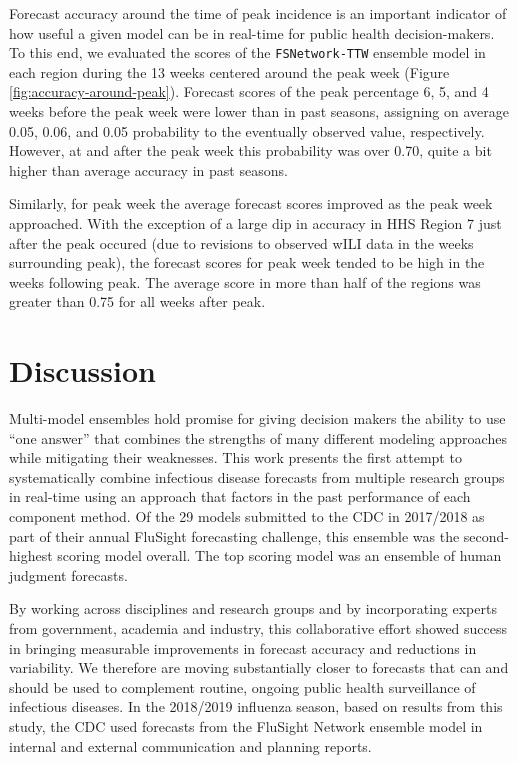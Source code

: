 \documentclass{article}\usepackage[]{graphicx}\usepackage[]{color}
\begin{document}
Forecast accuracy around the time of peak incidence is an important indicator of how useful a given model can be in real-time for public health decision-makers.
To this end, we evaluated the scores of the {\tt FSNetwork-TTW} ensemble model in each region during the 13 weeks centered around the peak week (Figure \ref{fig:accuracy-around-peak}).
Forecast scores of the peak percentage 6, 5, and 4 weeks before the peak week were lower than in past seasons, assigning on average
0.05,
0.06, and 
0.05
probability to the eventually observed value, respectively. 
However, at and after the peak week this probability was over 0.70, quite a bit higher than average accuracy in past seasons.

Similarly, for peak week the average forecast scores improved as the peak week approached. With the exception of a large dip in accuracy in HHS Region 7 just after the peak occured (due to revisions to observed wILI data in the weeks surrounding peak), the forecast scores for peak week tended to be high in the weeks following peak. The average score in more than half of the regions was greater than 0.75 for all weeks after peak. 


\section*{Discussion}

Multi-model ensembles hold promise for giving decision makers the ability to use ``one answer'' that combines the strengths of many different modeling approaches while mitigating their weaknesses. 
This work presents the first attempt to systematically combine infectious disease forecasts from multiple research groups in real-time using an approach that factors in the past performance of each component method.
Of the 29 models submitted to the CDC in 2017/2018 as part of their annual FluSight forecasting challenge, this ensemble was the second-highest scoring model overall. 
The top scoring model was an ensemble of human judgment forecasts.\cite{farrow2017human}

By working across disciplines and research groups and by incorporating experts from government, academia and industry, this collaborative effort showed success in bringing measurable improvements in forecast accuracy and reductions in variability.
We therefore are moving substantially closer to forecasts that can and should be used to complement routine, ongoing public health surveillance of infectious diseases.
In the 2018/2019 influenza season, based on results from this study, the CDC used forecasts from the FluSight Network ensemble model in internal and external communication and planning reports.
\end{document}
